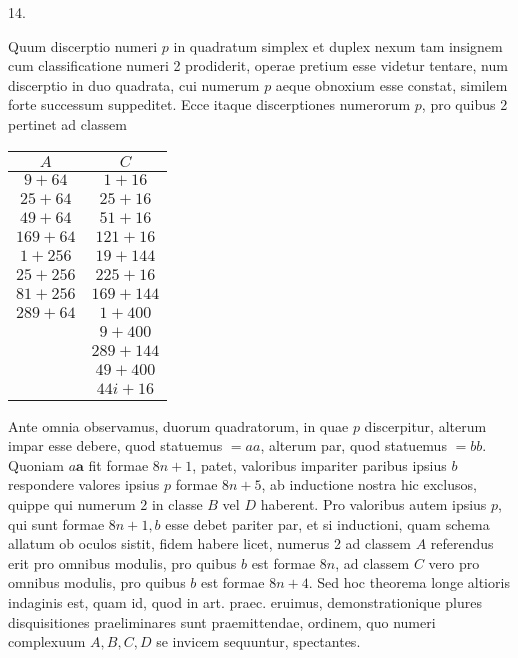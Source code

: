 \documentclass[10pt]{article}
\begin{document}
14.

Quum discerptio numeri \(p\) in quadratum simplex et duplex nexum tam insignem cum classificatione numeri 2 prodiderit, operae pretium esse videtur tentare, num discerptio in duo quadrata, cui numerum \(p\) aeque obnoxium esse constat, similem forte successum suppeditet. Ecce itaque discerptiones numerorum \(p\), pro quibus 2 pertinet ad classem

\begin{center}
\begin{tabular}{c|c}
\(A\) & \(C\) \\
\hline
\(9+64\) & \(1+16\) \\
\(25+64\) & \(25+16\) \\
\(49+64\) & \(51+16\) \\
\(169+64\) & \(121+16\) \\
\(1+256\) & \(19+144\) \\
\(25+256\) & \(225+16\) \\
\(81+256\) & \(169+144\) \\
\(289+64\) & \(1+400\) \\
 & \(9+400\) \\
 & \(289+144\) \\
 & \(49+400\) \\
 & \(44 i+16\) \\
\end{tabular}
\end{center}

Ante omnia observamus, duorum quadratorum, in quae \(p\) discerpitur, alterum impar esse debere, quod statuemus \(=a a\), alterum par, quod statuemus \(=b b\). Quoniam \(a \boldsymbol{a}\) fit formae \(8 n+1\), patet, valoribus impariter paribus ipsius \(b\) respondere valores ipsius \(p\) formae \(8 n+5\), ab inductione nostra hic exclusos, quippe qui numerum 2 in classe \(B\) vel \(D\) haberent. Pro valoribus autem ipsius \(p\), qui sunt formae \(8 n+1, b\) esse debet pariter par, et si inductioni, quam schema allatum ob oculos sistit, fidem habere licet, numerus 2 ad classem \(A\) referendus erit pro omnibus modulis, pro quibus \(b\) est formae \(8 n\), ad classem \(C\) vero pro omnibus modulis, pro quibus \(b\) est formae \(8 n+4\). Sed hoc theorema longe altioris indaginis est, quam id, quod in art. praec. eruimus, demonstrationique plures disquisitiones praeliminares sunt praemittendae, ordinem, quo numeri complexuum \(A, B, C, D\) se invicem sequuntur, spectantes.
\end{document}
